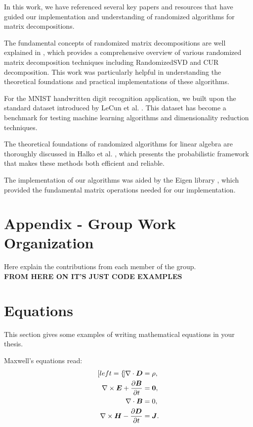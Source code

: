 \documentclass[11pt,a4paper]{article}
\begin{document}
In this work, we have referenced several key papers and resources that have guided our implementation and understanding of randomized algorithms for matrix decompositions.

\vspace{0.3cm}

The fundamental concepts of randomized matrix decompositions are well explained in 
\cite{erichsonRandomizedMatrixDecompositions2019}, which provides a comprehensive overview 
of various randomized matrix decomposition techniques including RandomizedSVD and CUR 
decomposition. This work was particularly helpful in understanding the theoretical 
foundations and practical implementations of these algorithms.

\vspace{0.3cm}

For the MNIST handwritten digit recognition application, we built upon the standard 
dataset introduced by LeCun et al. \cite{lecun1998mnist}. This dataset has become 
a benchmark for testing machine learning algorithms and dimensionality reduction 
techniques.

\vspace{0.3cm}

The theoretical foundations of randomized algorithms for linear algebra are thoroughly 
discussed in Halko et al. \cite{halko2011finding}, which presents the probabilistic 
framework that makes these methods both efficient and reliable.

\vspace{0.3cm}

The implementation of our algorithms was aided by the Eigen library \cite{eigenweb}, 
which provided the fundamental matrix operations needed for our implementation.

\section{Appendix - Group Work Organization}
Here explain the contributions from each member of the group.\\
\textbf{FROM HERE ON IT'S JUST CODE EXAMPLES}
\section{Equations}
\label{sec:eqs}
This section gives some examples of writing mathematical equations in your thesis.

Maxwell's equations read:
\begin{subequations}
    \label{eq:maxwell}
    \begin{align}[left=\empheqlbrace]
        \nabla\cdot \bm{D}                                         & = \rho, \label{eq:maxwell1}   \\
        \nabla \times \bm{E} +  \frac{\partial \bm{B}}{\partial t} & = \bm{0}, \label{eq:maxwell2} \\
        \nabla\cdot \bm{B}                                         & = 0, \label{eq:maxwell3}      \\
        \nabla \times \bm{H} - \frac{\partial \bm{D}}{\partial t}  & = \bm{J}. \label{eq:maxwell4}
    \end{align}
\end{subequations}
\end{document}
